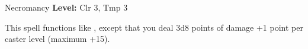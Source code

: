 {Necromancy}
{
	\textbf{Level:}
	Clr 3, Tmp 3\\
}
{
	This spell functions like , except that you deal 3d8 points of damage +1 point per caster level (maximum +15).

}
